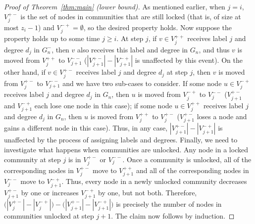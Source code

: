 \documentclass[12pt]{article}
\theoremstyle{definition}
\theoremstyle{remark}
\theoremstyle{remark}
\numberwithin{theorem}{section}
\begin{document}
\begin{proof}[Proof of Theorem~\ref{thm:main} (lower bound)]
As mentioned earlier, when $j = i$, $V_j^{+-}$ is the set of nodes in communities that are still locked (that is, of size at most $z_i-1$) and $V_j^{-+} = \emptyset$, so the desired property holds. Now suppose the property holds up to some time $j \geq i$. At step $j$, if $v \in V_j^{++}$ receives label $j$ and degree $d_j$ in $G_n^-$, then $v$ also receives this label and degree in $G_n$, and thus $v$ is moved from $V_j^{++}$ to $V_{j+1}^{--}$ ($|V_{j+1}^{+-}|-|V_{j+1}^{-+}|$ is unaffected by this event). On the other hand, if $v \in V_j^{+-}$ receives label $j$ and degree $d_j$ at step $j$, then $v$ is moved from $V_j^{+-}$ to $V_{j+1}^{--}$ and we have two sub-cases to consider. If some node $u \in V_j^{-+}$ receives label $j$ and degree $d_j$ in $G_n$, then $u$ is moved from $V_j^{-+}$ to $V_j^{--}$ ($V_{j+1}^{+-}$ and $V_{j+1}^{-+}$ each lose one node in this case); if some node $u \in V_j^{++}$ receives label $j$ and degree $d_j$ in $G_n$, then $u$ is moved from $V_j^{++}$ to $V_j^{+-}$ ($V_{j+1}^{+-}$ loses a node and gains a different node in this case). Thus, in any case, $|V_{j+1}^{+-}|-|V_{j+1}^{-+}|$ is unaffected by the process of assigning labels and degrees. Finally, we need to investigate what happens when communities are unlocked. Any node in a locked community at step $j$ is in $V_j^{+-}$ or $V_j^{--}$. Once a community is unlocked, all of the corresponding nodes in $V_j^{+-}$ move to $V_{j+1}^{++}$ and all of the corresponding nodes in $V_j^{--}$ move to $V_{j+1}^{-+}$. Thus, every node in a newly unlocked community decreases $V_{j+1}^{+-}$ by one or increases $V_{j+1}^{-+}$ by one, but not both. Therefore, $\Big(|V_j^{+-}|-|V_j^{-+}|\Big) - \Big(|V_{j+1}^{+-}|-|V_{j+1}^{-+}|\Big)$ is precisely the number of nodes in communities unlocked at step $j+1$. The claim now follows by induction. 


\end{proof}
\end{document}
